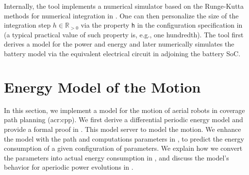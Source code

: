 Internally, the tool implements a numerical simulator based on the Runge-Kutta methods for numerical integration in . One can then personalize the size of the integration step $h\in\mathbb{R}_{>0}$ via the property {\small\tt h} in the configuration specification in  (a typical practical value of such property is, e.g., one hundredth). The tool first derives a model for the power and energy and later numerically simulates the battery model via the equivalent electrical circuit in  adjoining the battery SoC.


\section{Energy Model of the Motion}

In this section, we implement a model for the motion of aerial robots in coverage path planning (\Gls{acr:cpp}). We first derive a differential periodic energy model and provide a formal proof in . This model server to model the motion. We enhance the model with the path and computations parameters in , to predict the energy consumption of a given configuration of parameters. We explain how we convert the parameters into actual energy consumption in , and discuss the model's behavior for aperiodic power evolutions in .

